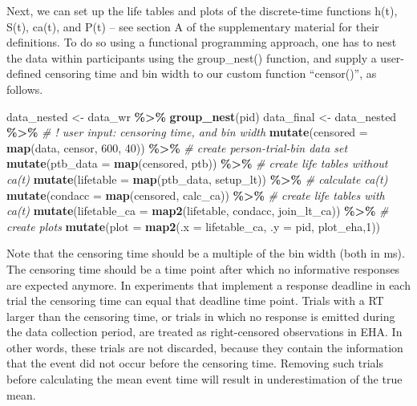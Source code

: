 \documentclass[
  man, donotrepeattitle,floatsintext]{apa6}
\newenvironment{Shaded}{\begin{snugshade}}{\end{snugshade}}
\newcommand{\AttributeTok}[1]{\textcolor[rgb]{0.13,0.29,0.53}{#1}}
\newcommand{\CommentTok}[1]{\textcolor[rgb]{0.56,0.35,0.01}{\textit{#1}}}
\newcommand{\DecValTok}[1]{\textcolor[rgb]{0.00,0.00,0.81}{#1}}
\newcommand{\FunctionTok}[1]{\textcolor[rgb]{0.13,0.29,0.53}{\textbf{#1}}}
\newcommand{\NormalTok}[1]{#1}
\newcommand{\OtherTok}[1]{\textcolor[rgb]{0.56,0.35,0.01}{#1}}
\newcommand{\SpecialCharTok}[1]{\textcolor[rgb]{0.81,0.36,0.00}{\textbf{#1}}}
\begin{document}
\normalsize

Next, we can set up the life tables and plots of the discrete-time functions h(t), S(t), ca(t), and P(t) -- see section A of the supplementary material for their definitions. To do so using a functional programming approach, one has to nest the data within participants using the group\_nest() function, and supply a user-defined censoring time and bin width to our custom function ``censor()'', as follows.

\footnotesize

\begin{Shaded}
\begin{Highlighting}[]
\NormalTok{data\_nested }\OtherTok{\textless{}{-}}\NormalTok{ data\_wr }\SpecialCharTok{\%\textgreater{}\%} \FunctionTok{group\_nest}\NormalTok{(pid)}
\NormalTok{data\_final }\OtherTok{\textless{}{-}}\NormalTok{ data\_nested }\SpecialCharTok{\%\textgreater{}\%} 
  \CommentTok{\# ! user input: censoring time, and bin width}
  \FunctionTok{mutate}\NormalTok{(}\AttributeTok{censored =} \FunctionTok{map}\NormalTok{(data, censor, }\DecValTok{600}\NormalTok{, }\DecValTok{40}\NormalTok{)) }\SpecialCharTok{\%\textgreater{}\%}   
  \CommentTok{\# create person{-}trial{-}bin data set}
  \FunctionTok{mutate}\NormalTok{(}\AttributeTok{ptb\_data =} \FunctionTok{map}\NormalTok{(censored, ptb)) }\SpecialCharTok{\%\textgreater{}\%}          
  \CommentTok{\# create life tables without ca(t)}
  \FunctionTok{mutate}\NormalTok{(}\AttributeTok{lifetable =} \FunctionTok{map}\NormalTok{(ptb\_data, setup\_lt)) }\SpecialCharTok{\%\textgreater{}\%}   
  \CommentTok{\# calculate ca(t)}
  \FunctionTok{mutate}\NormalTok{(}\AttributeTok{condacc =} \FunctionTok{map}\NormalTok{(censored, calc\_ca)) }\SpecialCharTok{\%\textgreater{}\%}      
  \CommentTok{\# create life tables with ca(t)}
  \FunctionTok{mutate}\NormalTok{(}\AttributeTok{lifetable\_ca =} \FunctionTok{map2}\NormalTok{(lifetable, condacc, join\_lt\_ca)) }\SpecialCharTok{\%\textgreater{}\%}    
  \CommentTok{\# create plots }
  \FunctionTok{mutate}\NormalTok{(}\AttributeTok{plot =} \FunctionTok{map2}\NormalTok{(}\AttributeTok{.x =}\NormalTok{ lifetable\_ca, }\AttributeTok{.y =}\NormalTok{ pid, plot\_eha,}\DecValTok{1}\NormalTok{))  }
\end{Highlighting}
\end{Shaded}

\normalsize

Note that the censoring time should be a multiple of the bin width (both in ms). The censoring time should be a time point after which no informative responses are expected anymore. In experiments that implement a response deadline in each trial the censoring time can equal that deadline time point. Trials with a RT larger than the censoring time, or trials in which no response is emitted during the data collection period, are treated as right-censored observations in EHA. In other words, these trials are not discarded, because they contain the information that the event did not occur before the censoring time. Removing such trials before calculating the mean event time will result in underestimation of the true mean.
\end{document}

